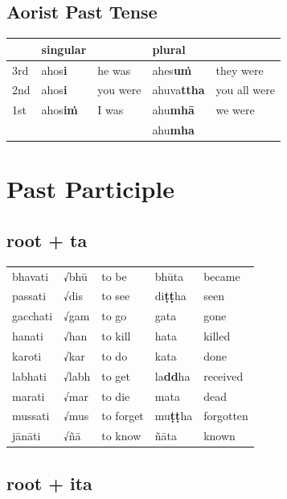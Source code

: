 \documentclass[11pt,oneside]{memoir}
\begin{document}
\subsection{Aorist Past Tense}
\label{sec:org917a34f}

\begin{center}
\begin{tabular}{lllll}
 & singular &  & plural & \\
\hline
3rd & ahos\textbf{i} & he was & ahes\textbf{uṁ} & they were\\
2nd & ahos\textbf{i} & you were & ahuva\textbf{ttha} & you all were\\
1st & ahos\textbf{iṁ} & I was & ahu\textbf{mhā} & we were\\
 &  &  & ahu\textbf{mha} & \\
\end{tabular}
\end{center}

\clearpage
\section{Past Participle}
\label{sec:org8b03341}
\subsection{root + ta}
\label{sec:org70b474e}

\begin{center}
\begin{tabular}{lllll}
bhavati & √bhū & to be & bhūta & became\\
passati & √dis & to see & di\textbf{ṭṭ}ha & seen\\
gacchati & √gam & to go & gata & gone\\
hanati & √han & to kill & hata & killed\\
karoti & √kar & to do & kata & done\\
labhati & √labh & to get & la\textbf{dd}ha & received\\
marati & √mar & to die & mata & dead\\
mussati & √mus & to forget & mu\textbf{ṭṭ}ha & forgotten\\
jānāti & √ñā & to know & ñāta & known\\
\end{tabular}
\end{center}
\subsection{root + ita}
\label{sec:org3469ded}
\end{document}
